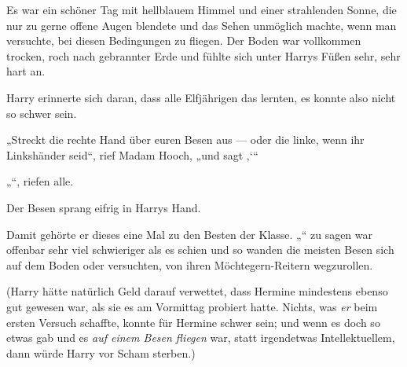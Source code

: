 Es war ein schöner Tag mit hellblauem Himmel und einer strahlenden Sonne, die nur zu gerne offene Augen blendete und das Sehen unmöglich machte, wenn man versuchte, bei diesen Bedingungen zu fliegen. Der Boden war vollkommen trocken, roch nach gebrannter Erde und fühlte sich unter Harrys Füßen sehr, sehr hart an.

Harry erinnerte sich daran, dass alle Elfjährigen das lernten, es konnte also nicht so schwer sein.

„Streckt die rechte Hand über euren Besen aus — oder die linke, wenn ihr Linkshänder seid“, rief Madam Hooch, „und sagt ‚‘“

„“, riefen alle.

Der Besen sprang eifrig in Harrys Hand.

Damit gehörte er dieses eine Mal zu den Besten der Klasse.
„“ zu sagen war offenbar sehr viel schwieriger als es schien und so wanden die meisten Besen sich auf dem Boden oder versuchten, von ihren Möchtegern-Reitern wegzurollen.

(Harry hätte natürlich Geld darauf verwettet, dass Hermine mindestens ebenso gut gewesen war, als sie es am Vormittag probiert hatte. Nichts, was \emph{er} beim ersten Versuch schaffte, konnte für Hermine schwer sein; und wenn es doch so etwas gab und es \emph{auf einem Besen fliegen} war, statt irgendetwas Intellektuellem, dann würde Harry vor Scham sterben.)


